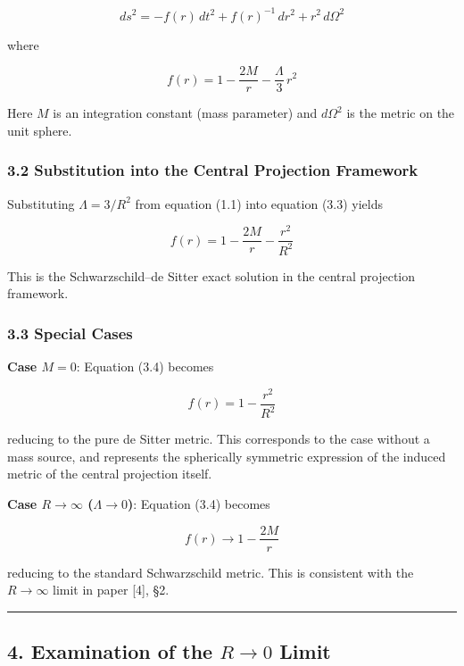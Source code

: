 \documentclass[a4paper,11pt]{article}
\theoremstyle{definition}
\begin{document}
\[ds^2 = -f(r)\,dt^2 + f(r)^{-1}\,dr^2 + r^2\,d\Omega^2 \tag{3.2}\]

where

\[f(r) = 1 - \frac{2M}{r} - \frac{\Lambda}{3}\,r^2 \tag{3.3}\]

Here \(M\) is an integration constant (mass parameter) and \(d\Omega^2\)
is the metric on the unit sphere.

\subsubsection{3.2 Substitution into the Central Projection
Framework}\label{substitution-into-the-central-projection-framework}

Substituting \(\Lambda = 3/R^2\) from equation (1.1) into equation (3.3)
yields

\[f(r) = 1 - \frac{2M}{r} - \frac{r^2}{R^2} \tag{3.4}\]

This is the Schwarzschild--de Sitter exact solution in the central
projection framework.

\subsubsection{3.3 Special Cases}\label{special-cases}

\textbf{Case \(M = 0\)}: Equation (3.4) becomes

\[f(r) = 1 - \frac{r^2}{R^2} \tag{3.5}\]

reducing to the pure de Sitter metric. This corresponds to the case
without a mass source, and represents the spherically symmetric
expression of the induced metric of the central projection itself.

\textbf{Case \(R \to \infty\) (\(\Lambda \to 0\))}: Equation (3.4)
becomes

\[f(r) \to 1 - \frac{2M}{r} \tag{3.6}\]

reducing to the standard Schwarzschild metric. This is consistent with
the \(R \to \infty\) limit in paper {[}4{]}, §2.

\begin{center}\rule{0.5\linewidth}{0.5pt}\end{center}

\subsection{\texorpdfstring{4. Examination of the \(R \to 0\)
Limit}{4. Examination of the R \textbackslash to 0 Limit}}\label{examination-of-the-r-to-0-limit}
\end{document}
